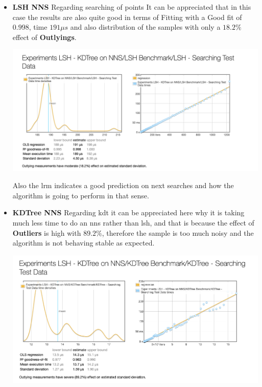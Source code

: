 \documentclass[12pt, a4paper]{article}
\begin{document}
\begin{itemize}
\item \textbf{LSH NNS}
Regarding searching of points It can be appreciated that in this case the results are also quite good in terms of Fitting with a Good fit of $0.998$, time $191 \mu s$ and also distribution of the samples with only a $18.2\%$ effect of \textbf{Outlyings}.

\begin{minipage}[t]{\linewidth}
  \includegraphics[width=\textwidth]{bench_lsh_nns_test_ds}
  \captionsetup{type=figure}
  \label{fig:bench_lsh_nns_test_ds}
\end{minipage}

Also the \acrshort{lrm} indicates a good prediction on next searches and how the algorithm is going to perform in that sense.

\item \textbf{KDTree NNS}
Regarding \acrshort{kdt} it can be appreciated here why it is taking much less time to do an \acrshort{nns} rather than \acrshort{lsh}, and that is because the effect of \textbf{Outliers} is high with $89.2\%$, therefore the sample is too much noisy and the algorithm is not behaving stable as expected.

\begin{minipage}[t]{\linewidth}
  \includegraphics[width=\textwidth]{bench_kdt_nns_test_ds}
  \captionsetup{type=figure}
  \label{fig:bench_kdt_nns_test_ds}
\end{minipage}


\end{itemize}
\end{document}
